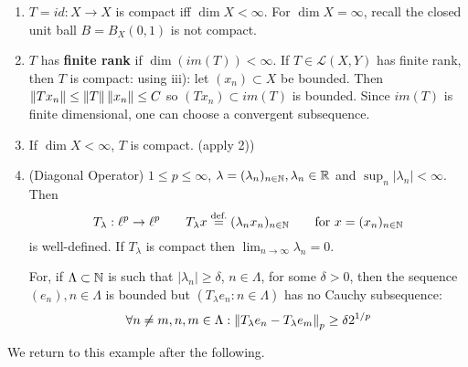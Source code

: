 \documentclass{article}
\begin{document}
\begin{example}
\label{examples of compact operators}
\begin{enumerate}[1)]
    \item $T=id:X\to X$ is compact iff $\dim X <\infty$. For $\dim X=\infty$, recall the closed unit ball $B=B_X(0,1)$ is not compact. 
    \item $T$ has \textbf{finite rank} if $\dim (im(T))<\infty$. If $T\in \mathcal{L}(X,Y)$ has finite rank, then $T$ is compact: using  iii): let $(x_n)\subset X$ be bounded. Then $\left\|{Tx_n}\right\| \leq \left\|{T}\right\|\left\|{x_n}\right\| \leq C$ so $(Tx_n)\subset im(T)$ is bounded. Since $im(T)$ is finite dimensional, one can choose a convergent subsequence.  

    \item If $\dim X<\infty$, $T$ is compact. (apply 2))

    \item (Diagonal Operator) $1\leq p \leq \infty$, $\lambda = (\lambda_n)_{n \in \mathbb{N}}, \lambda_n \in \mathbb{R}$ and $\sup_n |\lambda_n|<\infty$. Then  
    $$
    T_\lambda: \ell^p \to \ell^p \qquad T_\lambda x \stackrel{\text{def.}}{=} (\lambda_n x_n)_{n\in \mathbb{N}} \qquad \text{for\ } x=(x_n)_{n\in \mathbb{N}}
    $$
    is well-defined. If $T_\lambda$ is compact then $\lim_{n\to \infty} \lambda_n = 0$.  

    For, if $\Lambda \subset \mathbb{N}$ is such that $|\lambda_n|\geq \delta$, $n\in \Lambda$, for some $\delta>0$, then the sequence $(e_n), n\in \Lambda$ is bounded but $(T_{\lambda}e_n: n\in \Lambda)$ has no Cauchy subsequence:  
    $$
    \forall n\neq m, n,m\in \Lambda: \left\|{T_\lambda e_n - T_\lambda e_m}\right\|_p \geq \delta 2^{1/p}
    $$  
\end{enumerate}
\end{example}

We return to this example after the following.  
\end{document}
